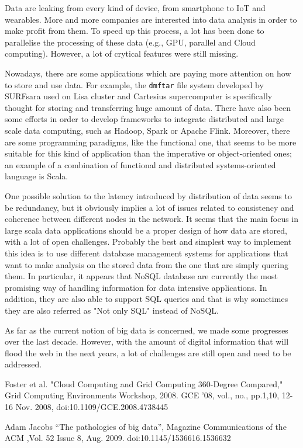\documentclass[a4paper]{IEEEtran}
\begin{document}
Data are leaking from every kind of device, from smartphone to IoT and wearables. More and more companies are interested into data analysis in order to make profit from them. To speed up this process, a lot has been done to parallelise the processing of these data (e.g., GPU, parallel and Cloud computing). However, a lot of crytical features were still missing.

Nowadays, there are some applications which are paying more attention on how to store and use data. For example, the \texttt{dmftar} file system developed by SURFsara used on Lisa cluster and Cartesius supercomputer is specifically thought for storing and transferring huge amount of data. There have also been some efforts in order to develop frameworks to integrate distributed and large scale data computing, such as Hadoop, Spark or Apache Flink. Moreover, there are some programming paradigms, like the functional one, that seems to be more suitable for this kind of application than the imperative or object-oriented ones; an example of a combination of functional and distributed systems-oriented language is Scala.

One possible solution to the latency introduced by distribution of data seems to be redundancy, but it obviously implies a lot of issues related to consistency and coherence between different nodes in the network.
It seems that the main focus in large scala data applications should be a proper design of how data are stored, with a lot of open challenges. Probably the best and simplest way to implement this idea is to use different database management systems for applications that want to make analysis on the stored data from the one that are simply quering them. In particular, it appears that NoSQL database are currently the most promising way of handling information for data intensive applications. In addition, they are also able to support SQL queries and that is why sometimes they are also referred as "Not only SQL" instead of NoSQL.

As far as the current notion of big data is concerned, we made some progresses over the last decade. However, with the amount of digital information that will flood the web in the next years, a lot of challenges are still open and need to be addressed.

\begin{thebibliography}{1}

Foster  et  al.  "Cloud  Computing  and  Grid  Computing  360-Degree  Compared," Grid Computing Environments Workshop, 2008. GCE '08, vol., no., pp.1,10, 12-16 Nov. 2008, doi:10.1109/GCE.2008.4738445

Adam  Jacobs  “The  pathologies  of  big  data”,  Magazine Communications  of  the ACM ,Vol. 52 Issue 8, Aug. 2009. doi:10.1145/1536616.1536632

\end{thebibliography}
\end{document}
